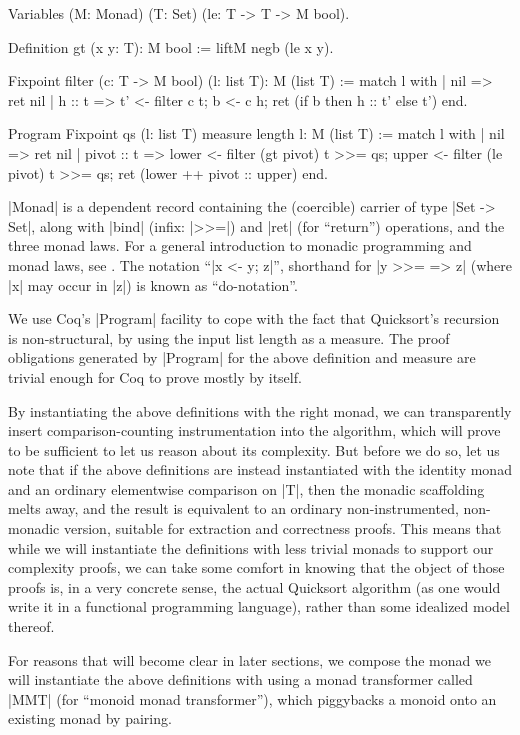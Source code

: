 \documentclass[runningheads]{llncs}
\begin{document}
\begin{code}
  Variables (M: Monad) (T: Set) (le: T -> T -> M bool).

  Definition gt (x y: T): M bool := liftM negb (le x y).

  Fixpoint filter (c: T -> M bool) (l: list T): M (list T) :=
    match l with
    | nil => ret nil
    | h :: t =>
      t' <- filter c t;
      b <- c h;
      ret (if b then h :: t' else t')
    end.

  Program Fixpoint qs (l: list T) {measure length l}: M (list T) :=
    match l with
    | nil => ret nil
    | pivot :: t =>
        lower <- filter (gt pivot) t >>= qs;
        upper <- filter (le pivot) t >>= qs;
        ret (lower ++ pivot :: upper)
    end.
\end{code}
|Monad| is a dependent record containing the (coercible) carrier of type |Set -> Set|, along with |bind| (infix: |>>=|) and |ret| (for ``return'') operations, and the three monad laws. For a general introduction to monadic programming and monad laws, see \cite{wadler93monads}. The notation ``|x <- y; z|'', shorthand for |y >>= \x => z| (where |x| may occur in |z|) is known as ``do-notation''.

We use Coq's |Program| facility \cite{subsetcoercions} to cope with the fact that Quicksort's recursion is non-structural, by using the input list length as a measure. The proof obligations generated by |Program| for the above definition and measure are trivial enough for Coq to prove mostly by itself.

By instantiating the above definitions with the right monad, we can transparently insert comparison-counting instrumentation into the algorithm, which will prove to be sufficient to let us reason about its complexity. But before we do so, let us note that if the above definitions are instead instantiated with the identity monad and an ordinary elementwise comparison on |T|, then the monadic scaffolding melts away, and the result is equivalent to an ordinary non-instrumented, non-monadic version, suitable for extraction and correctness proofs. This means that while we will instantiate the definitions with less trivial monads to support our complexity proofs, we can take some comfort in knowing that the object of those proofs is, in a very concrete sense, the actual Quicksort algorithm (as one would write it in a functional programming language), rather than some idealized model thereof.

For reasons that will become clear in later sections, we compose the monad we will instantiate the above definitions with using a monad transformer called |MMT| (for ``monoid monad transformer''), which piggybacks a monoid onto an existing monad by pairing.
\end{document}
